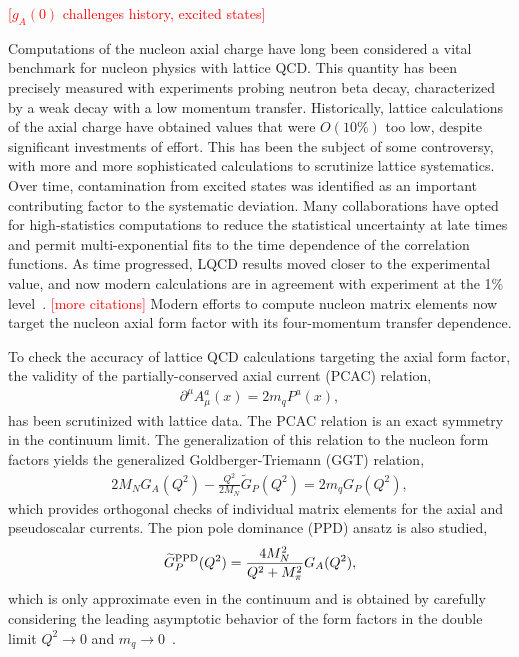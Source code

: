 
\textcolor{red}{[$g_A(0)$ challenges history, excited states]}

Computations of the nucleon axial charge have long been considered
 a vital benchmark for nucleon physics with lattice QCD.
This quantity has been precisely measured with experiments probing neutron beta decay,
 characterized by a weak decay with a low momentum transfer.
Historically, lattice calculations of the axial charge have obtained values
 that were $O(10\%)$ too low, despite significant investments of effort.
This has been the subject of some controversy,
 with more and more sophisticated calculations to scrutinize lattice systematics.
Over time, contamination from excited states was identified as
 an important contributing factor to the systematic deviation.
Many collaborations have opted for high-statistics computations
 to reduce the statistical uncertainty at late times and permit
 multi-exponential fits to the time dependence of the correlation functions.
As time progressed, LQCD results moved closer to the experimental value,
 and now modern calculations are in agreement with experiment
 at the 1\% level~\cite{Kronfeld:2019nfb}.
\textcolor{red}{[more citations]}
Modern efforts to compute nucleon matrix elements now target the nucleon
 axial form factor with its four-momentum transfer dependence.

To check the accuracy of lattice QCD calculations targeting the axial form factor,
 the validity of the partially-conserved axial current (PCAC) relation,
\begin{align}
 \partial^\mu A^{a}_{\mu}(x) = 2 m_q P^{a}(x),
 \label{eq:pcac}
\end{align}
 has been scrutinized with lattice data.
The PCAC relation is an exact symmetry in the continuum limit.
The generalization of this relation to the nucleon form factors
 yields the generalized Goldberger-Triemann (GGT) relation,
\begin{align}
 2 M_N G_A(Q^2) -\frac{Q^2}{2M_N} \widetilde{G}_P(Q^2) = 2 m_q G_{P}(Q^2),
 \label{eq:ggt}
\end{align}
 which provides orthogonal checks of individual matrix elements
 for the axial and pseudoscalar currents.
The pion pole dominance (PPD) ansatz is also studied,
\begin{align}
 \widetilde{G}^{\rm PPD}_P(Q^2) = \frac{4M_N^2}{Q^2+M_\pi^2} G_A(Q^2),
 \label{eq:ppd}
\end{align}
 which is only approximate even in the continuum and is obtained
 by carefully considering the leading asymptotic behavior of the
 form factors in the double limit $Q^2\to0$ and $m_q\to0$~\cite{Sasaki:2007gw}.

